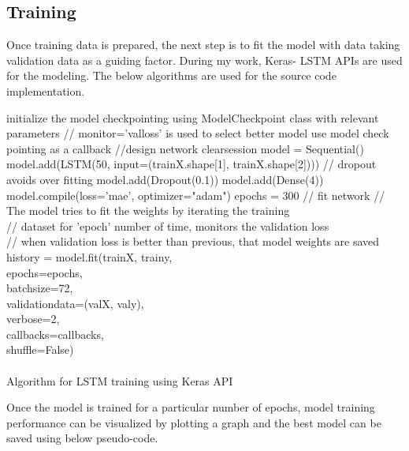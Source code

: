 \subsection{Training }
Once training data is prepared, the next step is to fit the model with data taking validation data as a guiding factor. During my work, Keras- LSTM APIs are used for the modeling. The below algorithms are used for the source code implementation.\\
\begin{algorithm}[H]
\SetAlgoLined
{}
 initialize the model checkpointing using ModelCheckpoint class with relevant parameters\;
 // monitor='val\textunderscore loss' is used to select better model\;
	use model check pointing as a callback\;
 //design network\;
 clear\textunderscore session\;
 model = Sequential()\;
 model.add(LSTM(50, input\textunderscore =(train\textunderscore X.shape[1], train\textunderscore X.shape[2]))) \;
 // dropout avoids over fitting \;
 model.add(Dropout(0.1))\; 
 model.add(Dense(4))\;
 model.compile(loss='mae', optimizer="adam")\;
 epochs = 300\;
 // fit network\;
 // The model tries to fit the weights by iterating the training \\
 // dataset for 'epoch' number of time, monitors the validation loss  \\
 // when validation loss is better than previous, that model weights are saved
 history = model.fit(train\textunderscore X, train\textunderscore y, \\
 \HS \HS \HS \HS epochs=epochs, \\
 \HS \HS \HS \HS batch\textunderscore size=72,\\
 \HS \HS \HS \HS validation\textunderscore data=(val\textunderscore X, val\textunderscore y),\\
 \HS \HS \HS \HS verbose=2,\\
 \HS \HS \HS \HS callbacks=callbacks,\\
 \HS \HS \HS \HS shuffle=False)
~\\
~\\
\caption{Algorithm for LSTM training using Keras API} 
\end{algorithm} \label{training-algo}

Once the model is trained for a particular number of epochs, model training performance can be visualized by plotting a graph and the best model can be saved using below pseudo-code. \\

